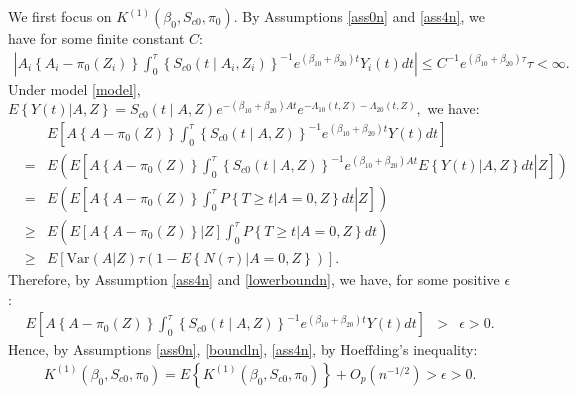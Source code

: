 \documentclass[11pt]{article}
\newcommand{\ee}{\end{eqnarray}}
\newcommand{\eqnn}{\begin{eqnarray*}}
\newcommand{\een}{\end{eqnarray*}}
\newcommand{\be}{\begin{eqnarray}}
\begin{document}
We first focus on $K^{(1)}(\beta_0,S_{c0},\pi_{0})$.
By Assumptions \ref{ass0n} and \ref{ass4n}, we have for some finite constant $C$:
\be\label{boundedn}
\left|A_i\left\{A_i-\pi_{0}(Z_i)\right\}\int_0^{\tau}\left\{S_{c0}(t \mid A_i,Z_i)\right\}^{-1}e^{(\beta_{10}+\beta_{20})t}Y_i(t)dt\right|\leq C^{-1}e^{(\beta_{10}+\beta_{20})\tau}\tau<\infty.
\ee
Under model \eqref{model}, 
$
E\left\{\left.Y(t)\right| A,Z\right\}=S_{c0}(t \mid A,Z)e^{-(\beta_{10}+\beta_{20})At}e^{-\Lambda_{10}(t,Z)-\Lambda_{20}(t,Z)},
$ we have:
\eqnn
&&E\left[A\left\{A-\pi_{0}(Z)\right\}\int_0^{\tau}\left\{S_{c0}(t \mid A,Z)\right\}^{-1}e^{(\beta_{10}+\beta_{20})t}Y(t)dt\right]\\
&=&E\left(E\left[\left.A\left\{A-\pi_{0}(Z)\right\}\int_0^{\tau}\left\{S_{c0}(t \mid A,Z)\right\}^{-1}e^{(\beta_{10}+\beta_{20})At}E\left\{Y(t)| A,Z\right\}dt \right| Z\right]\right)\\
&=&E\left(E\left[\left. A\left\{A-\pi_{0}(Z)\right\}\int_0^{\tau}P\left\{\left.T\geq t\right| A=0,Z\right\} dt\right| Z\right]\right)\\
&\geq&E\left(E\left[\left. A\left\{A-\pi_0(Z)\right\}\right| Z\right] \int_0^{\tau}P\left\{\left.T\geq t\right| A=0,Z\right\} dt\right)\\&\geq&E\left[\mbox{Var}\left(\left. A\right| Z\right) \tau (1-E\left\{\left.N(\tau) \right| A=0,Z\right\})\right].
\een
Therefore, by  Assumption \ref{ass4n} and \ref{lowerboundn}, we have, for some positive $\epsilon$:
\be\label{eqposn}
E\left[A\left\{A-\pi_{0}(Z)\right\}\int_0^{\tau}\left\{S_{c0}(t \mid A,Z)\right\}^{-1}e^{(\beta_{10}+\beta_{20})t}Y(t)dt\right]&>&\epsilon>0.
\ee
Hence, by Assumptions \ref{ass0n}, \ref{boundln}, \ref{ass4n}, by Hoeffding's inequality: 
\eqnn
K^{(1)}(\beta_0,S_{c0}, \pi_{0})=E\left\{K^{(1)}(\beta_0,S_{c0}, \pi_{0})\right\}+O_p(n^{-1/2})>\epsilon>0.
\een
\end{document}
